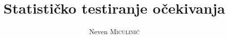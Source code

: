 \documentclass[times, utf8, seminar, numeric]{fer}
\begin{document}
\nocite{*}
\title{Statističko testiranje očekivanja}
\author{Neven \textsc{Miculinić}}

\maketitle

\tableofcontents

\graphicspath{{Pictures/}} 

 






\end{document}
